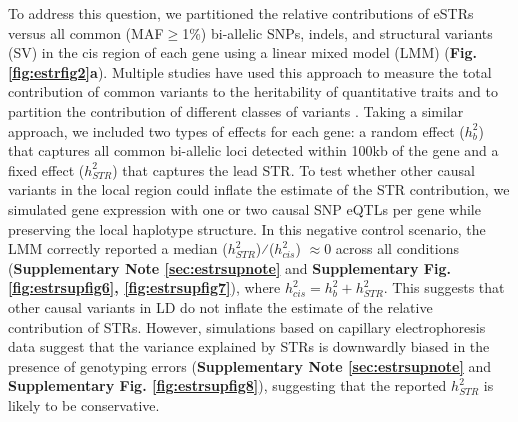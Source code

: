 To address this question, we partitioned the relative contributions of eSTRs versus all common (MAF$\geq$1\%) bi-allelic SNPs, indels, and structural variants (SV) in the cis region of each gene using a linear mixed model (LMM) (\textbf{Fig. \ref{fig:estrfig2}a}). Multiple studies have used this approach to measure the total contribution of common variants to the heritability of quantitative traits and to partition the contribution of different classes of variants \cite{YangBenyaminMcEvoyEtAl2010,GusevLeeNealeEtAl2014}. Taking a similar approach, we included two types of effects for each gene: a random effect ($h_b^2$) that captures all common bi-allelic loci detected within 100kb of the gene and a fixed effect ($h_{STR}^2$) that captures the lead STR. To test whether other causal variants in the local region could inflate the estimate of the STR contribution, we simulated gene expression with one or two causal SNP eQTLs per gene while preserving the local haplotype structure. In this negative control scenario, the LMM correctly reported a median ($h_{STR}^2$)⁄($h_{cis}^2 $) $\approx 0$ across all conditions (\textbf{Supplementary Note \ref{sec:estrsupnote}} and \textbf{Supplementary Fig. \ref{fig:estrsupfig6}, \ref{fig:estrsupfig7}}), where $h_{cis}^2=h_b^2+h_{STR}^2$. This suggests that other causal variants in LD do not inflate the estimate of the relative contribution of STRs. However, simulations based on capillary electrophoresis data suggest that the variance explained by STRs is downwardly biased in the presence of genotyping errors (\textbf{Supplementary Note \ref{sec:estrsupnote}} and \textbf{Supplementary Fig. \ref{fig:estrsupfig8}}), suggesting that the reported $h_{STR}^2$ is likely to be conservative.  

